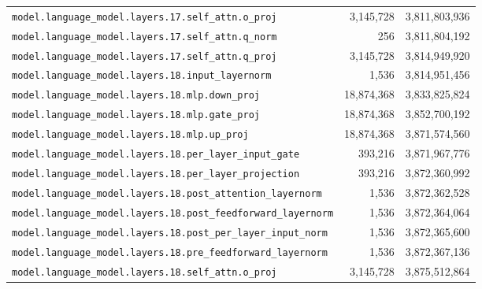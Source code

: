 \documentclass[10pt,a4paper]{article}
\theoremstyle{definition}
\begin{document}
\begin{appendices}
\begin{longtable}{p{9.5cm}rr}
\texttt{model.\allowbreak{}language\_model.\allowbreak{}layers.\allowbreak{}17.\allowbreak{}self\_attn.\allowbreak{}o\_proj} & 3,145,728 & 3,811,803,936 \\
\texttt{model.\allowbreak{}language\_model.\allowbreak{}layers.\allowbreak{}17.\allowbreak{}self\_attn.\allowbreak{}q\_norm} & 256 & 3,811,804,192 \\
\texttt{model.\allowbreak{}language\_model.\allowbreak{}layers.\allowbreak{}17.\allowbreak{}self\_attn.\allowbreak{}q\_proj} & 3,145,728 & 3,814,949,920 \\
\texttt{model.\allowbreak{}language\_model.\allowbreak{}layers.\allowbreak{}18.\allowbreak{}input\_layernorm} & 1,536 & 3,814,951,456 \\
\texttt{model.\allowbreak{}language\_model.\allowbreak{}layers.\allowbreak{}18.\allowbreak{}mlp.\allowbreak{}down\_proj} & 18,874,368 & 3,833,825,824 \\
\texttt{model.\allowbreak{}language\_model.\allowbreak{}layers.\allowbreak{}18.\allowbreak{}mlp.\allowbreak{}gate\_proj} & 18,874,368 & 3,852,700,192 \\
\texttt{model.\allowbreak{}language\_model.\allowbreak{}layers.\allowbreak{}18.\allowbreak{}mlp.\allowbreak{}up\_proj} & 18,874,368 & 3,871,574,560 \\
\texttt{model.\allowbreak{}language\_model.\allowbreak{}layers.\allowbreak{}18.\allowbreak{}per\_layer\_input\_gate} & 393,216 & 3,871,967,776 \\
\texttt{model.\allowbreak{}language\_model.\allowbreak{}layers.\allowbreak{}18.\allowbreak{}per\_layer\_projection} & 393,216 & 3,872,360,992 \\
\texttt{model.\allowbreak{}language\_model.\allowbreak{}layers.\allowbreak{}18.\allowbreak{}post\_attention\_layernorm} & 1,536 & 3,872,362,528 \\
\texttt{model.\allowbreak{}language\_model.\allowbreak{}layers.\allowbreak{}18.\allowbreak{}post\_feedforward\_layernorm} & 1,536 & 3,872,364,064 \\
\texttt{model.\allowbreak{}language\_model.\allowbreak{}layers.\allowbreak{}18.\allowbreak{}post\_per\_layer\_input\_norm} & 1,536 & 3,872,365,600 \\
\texttt{model.\allowbreak{}language\_model.\allowbreak{}layers.\allowbreak{}18.\allowbreak{}pre\_feedforward\_layernorm} & 1,536 & 3,872,367,136 \\
\texttt{model.\allowbreak{}language\_model.\allowbreak{}layers.\allowbreak{}18.\allowbreak{}self\_attn.\allowbreak{}o\_proj} & 3,145,728 & 3,875,512,864 \\

\end{longtable}
\end{appendices}
\end{document}
